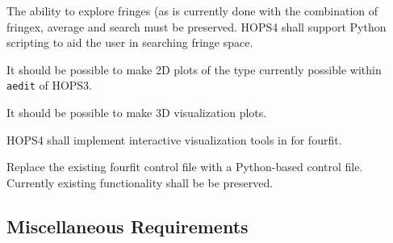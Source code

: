 \begin{description}
 The ability to explore fringes (as is currently done with the 
combination of \acs{fringex}, \acs{average} and search must be preserved. 
HOPS4 shall support \acs{Python} scripting to aid the user in searching 
fringe space.

 It should be possible to make 2D plots of the type currently possible 
within \texttt{\acs{aedit}} of HOPS3.

 It should be possible to make 3D visualization plots.

 HOPS4 shall implement interactive visualization tools in for \acs{fourfit}.

 Replace the existing \acs{fourfit} control file with a 
\acs{Python}-based control file. Currently existing functionality shall be be 
preserved. 


\end{description}



\subsection{Miscellaneous Requirements}
\label{sec:miscreq}

